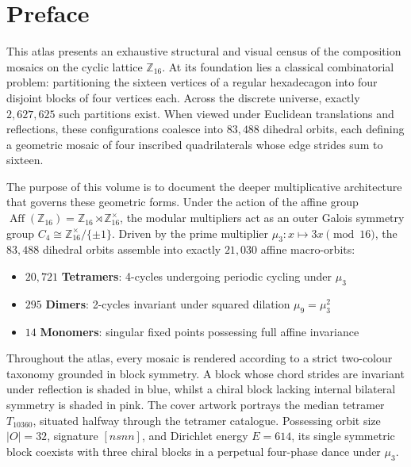 
\chapter*{Preface}

This atlas presents an exhaustive structural and visual census of the composition mosaics on the cyclic lattice $\mathbb{Z}_{16}$. At its foundation lies a classical combinatorial problem: partitioning the sixteen vertices of a regular hexadecagon into four disjoint blocks of four vertices each. Across the discrete universe, exactly $2{,}627{,}625$ such partitions exist. When viewed under Euclidean translations and reflections, these configurations coalesce into $83{,}488$ dihedral orbits, each defining a geometric mosaic of four inscribed quadrilaterals whose edge strides sum to sixteen.

The purpose of this volume is to document the deeper multiplicative architecture that governs these geometric forms. Under the action of the affine group $\operatorname{Aff}(\mathbb{Z}_{16}) = \mathbb{Z}_{16} \rtimes \mathbb{Z}_{16}^\times$, the modular multipliers act as an outer Galois symmetry group $C_4 \cong \mathbb{Z}_{16}^\times / \{\pm 1\}$. Driven by the prime multiplier $\mu_3 \colon x \mapsto 3x \pmod{16}$, the $83{,}488$ dihedral orbits assemble into exactly $21{,}030$ affine macro-orbits:
\begin{itemize}
  \item $20{,}721$ \textbf{Tetramers}: 4-cycles undergoing periodic cycling under $\mu_3$
  \item $295$ \textbf{Dimers}: 2-cycles invariant under squared dilation $\mu_9 = \mu_3^2$
  \item $14$ \textbf{Monomers}: singular fixed points possessing full affine invariance
\end{itemize}

Throughout the atlas, every mosaic is rendered according to a strict two-colour taxonomy grounded in block symmetry. A block whose chord strides are invariant under reflection is shaded in blue, whilst a chiral block lacking internal bilateral symmetry is shaded in pink. The cover artwork portrays the median tetramer $T_{10360}$, situated halfway through the tetramer catalogue. Possessing orbit size $|O|=32$, signature $[nsnn]$, and Dirichlet energy $E=614$, its single symmetric block coexists with three chiral blocks in a perpetual four-phase dance under $\mu_3$.

